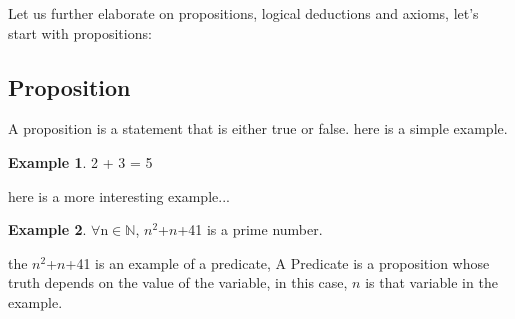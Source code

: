 \documentclass{article}
\theoremstyle{definition}
\newtheorem{example}{Example}
\newcommand{\N}{\mathbb{N}}
\begin{document}
Let us further elaborate on propositions, logical deductions and axioms, let's start with propositions:

\subsection{Proposition}

A proposition is a statement that is either true or false.
here is a simple example.

\begin{example}
  2 + 3 = 5
\end{example}

here is a more interesting example...

\begin{example}
$\forall$n$\in$$\N$, $n^2$+$n$+41 is a prime number.
\end{example}
the $n^2$+$n$+41 is an example of a predicate, A Predicate is a proposition whose truth depends on the value of the variable, in this case, $n$ is that variable in the example.
\end{document}
